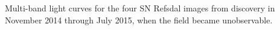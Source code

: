 \label{fig:LightCurves}
Multi-band light curves for the four SN Refsdal images from discovery in November 2014 through July 2015, when the field became unobservable. 